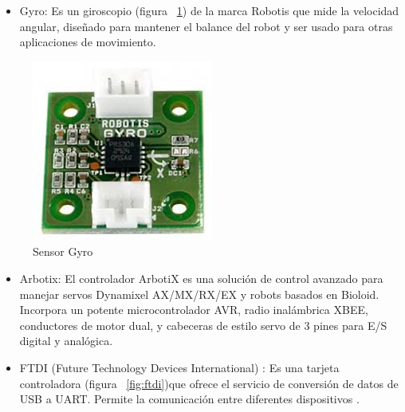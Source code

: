 \begin{itemize}
\item Gyro: Es un giroscopio (figura ~\ref{fig:gyro}) de la marca Robotis que mide la velocidad angular, diseñado para mantener el balance del robot y
ser usado para otras aplicaciones de movimiento. \cite{gyro} 

\end{itemize}

\begin{figure}[hbtp]
\centering
\label{fig:gyro}
\includegraphics[scale=0.5]{imagenes/gyro.jpg}
\caption{Sensor Gyro}
\end{figure}

\begin{itemize}
\item Arbotix: El controlador ArbotiX es una solución de control avanzado para manejar servos Dynamixel AX/MX/RX/EX y robots
basados en Bioloid. Incorpora un potente microcontrolador AVR, radio inalámbrica XBEE, conductores de motor dual, y cabeceras
de estilo servo de 3 pines para E/S digital y analógica.\cite{arbotix}

\end{itemize}


\begin{itemize}
\item FTDI (Future Technology Devices International) : Es una tarjeta controladora  (figura ~\ref{fig:ftdi})que ofrece el servicio de conversión de 
datos de USB a UART. Permite la comunicación entre diferentes dispositivos \cite{ftdi}.

\end{itemize}

